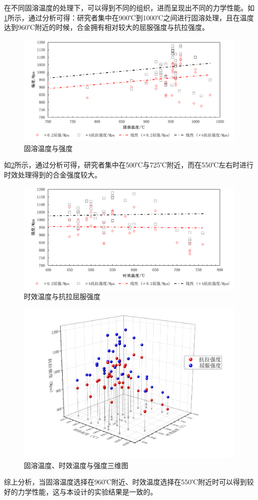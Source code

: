 在不同固溶温度的处理下，可以得到不同的组织，进而呈现出不同的力学性能。如\ref{fig:固溶温度与强度}所示，通过分析可得：研究者集中在900℃到1000℃之间进行固溶处理，且在温度达到960℃附近的时候，合金拥有相对较大的屈服强度与抗拉强度。
\begin{figure}[h!]
	\centering
	\includegraphics[width=0.7\linewidth]{TC4钛合金热处理研究进展/固溶温度与强度}
	\caption{固溶温度与强度}
	\label{fig:固溶温度与强度}
\end{figure}

如\ref{fig:时效温度与抗拉屈服强度}所示，通过分析可得，研究者集中在500℃与725℃附近，而在550℃左右时进行时效处理得到的合金强度较大。
\begin{figure}[h!]
	\centering
	\includegraphics[width=0.7\linewidth]{TC4钛合金热处理研究进展/时效温度与强度}
	\caption{时效温度与抗拉屈服强度}
	\label{fig:时效温度与抗拉屈服强度}
\end{figure}

\begin{figure}[h!]
	\centering
	\includegraphics[width=0.7\linewidth]{TC4钛合金热处理研究进展/固溶温度、时效温度与强度}
	\caption{固溶温度、时效温度与强度三维图}
	\label{fig:}
\end{figure}
综上分析，当固溶温度选择在960℃附近、时效温度选择在550℃附近时可以得到较好的力学性能，这与本设计的实验结果是一致的。

